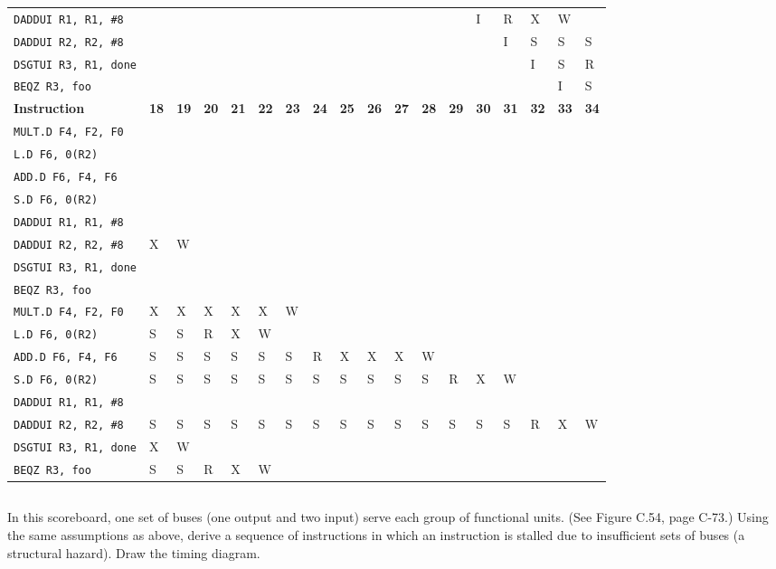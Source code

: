 \documentclass{article}
\begin{document}
\begin{adjustwidth}{2.5em}{0pt}
\begin{tabular}{|p{3.5cm}|p{.2cm}|p{.2cm}|p{.2cm}|p{.2cm}|p{.2cm}|p{.2cm}|p{.2cm}|p{.2cm}|p{.2cm}|p{.2cm}|p{.2cm}|p{.2cm}|p{.2cm}|p{.2cm}|p{.2cm}|p{.2cm}|p{.2cm}|}
\texttt{DADDUI R1, R1, \#8} & & & & & & & & & & & & & I& R& X& W& \\
\texttt{DADDUI R2, R2, \#8} & & & & & & & & & & & & & & I& S& S& S \\ 
\texttt{DSGTUI R3, R1, done} & & & & & & & & & & & & & & & I& S& R\\
\texttt{BEQZ R3, foo} & & & & & & & & & & & & & & & & I& S\\
\hline
\textbf{Instruction}&\textbf{18}&\textbf{19}&\textbf{20}&\textbf{21}&\textbf{22}&\textbf{23}&\textbf{24}&\textbf{25}&\textbf{26}&\textbf{27}&\textbf{28}&\textbf{29}&\textbf{30}&\textbf{31}&\textbf{32}&\textbf{33}&\textbf{34}\\
\hline
\texttt{MULT.D F4, F2, F0} & & & & & & & & & & & & & & & & & \\
\texttt{L.D F6, 0(R2)} & & & & & & & & & & & & & & & & & \\
\texttt{ADD.D F6, F4, F6} & & & & & & & & & & & & & & & & &\\ 
\texttt{S.D F6, 0(R2)} & & & & & & & & & & & & & & & & & \\
\texttt{DADDUI R1, R1, \#8} & & & & & & & & & & & & & & & & & \\
\texttt{DADDUI R2, R2, \#8} & X& W& & & & & & & & & & & & & & & \\
\texttt{DSGTUI R3, R1, done} & & & & & & & & & & & & & & & & & \\
\texttt{BEQZ R3, foo} & & & & & & & & & & & & & & & & & \\
\texttt{MULT.D F4, F2, F0} & X& X& X& X& X& W& & & & & & & & & & & \\
\texttt{L.D F6, 0(R2)}& S& S& R& X& W& & & & & & & & & & & & \\
\texttt{ADD.D F6, F4, F6}& S& S& S& S& S& S& R& X& X& X& W& & & & & & \\
\texttt{S.D F6, 0(R2)}& S& S& S& S& S& S& S& S& S& S& S& R& X& W& & & \\
\texttt{DADDUI R1, R1, \#8}& & & & & & & & & & & & & & & & & \\
\texttt{DADDUI R2, R2, \#8}& S& S& S& S& S& S& S& S& S& S& S& S& S& S& R& X& W\\
\texttt{DSGTUI R3, R1, done} & X& W& & & & & & & & & & & & & & & \\
\texttt{BEQZ R3, foo} & S& S& R& X& W& & & & & & & & & & & & \\
\hline
\end{tabular}

\subsection{}
In this scoreboard, one set of buses (one output and two input) serve each group of functional units. (See Figure C.54, page C-73.) Using the same assumptions as above, derive a sequence of instructions in which an instruction is stalled due to insufficient sets of buses (a structural hazard). Draw the timing diagram.


\end{adjustwidth}
\end{document}

